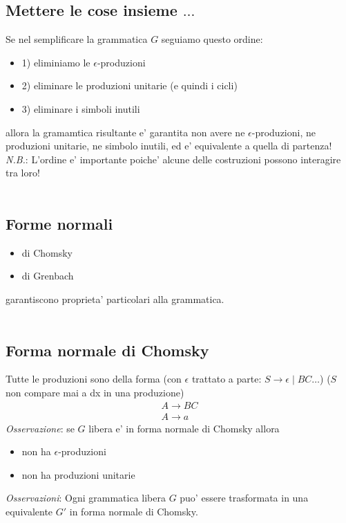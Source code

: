 \documentclass[a4paper,12pt]{article}
\begin{document}
{\subsection*{Mettere le cose insieme $\dots$}
Se nel semplificare la grammatica $G$ seguiamo questo ordine:
\begin{itemize}
  \item 1) eliminiamo le $\epsilon$-produzioni
  \item 2) eliminare le produzioni unitarie (e quindi i cicli)
  \item 3) eliminare i simboli inutili
\end{itemize}
allora la gramamtica risultante e' garantita non avere ne $\epsilon$-produzioni, ne produzioni unitarie, ne simbolo inutili, ed e' equivalente a quella di partenza! \\
\textit{N.B.}: L'ordine e' importante poiche' alcune delle costruzioni possono interagire tra loro!  \\
\vspace{2em} \\
\subsection{Forme normali}
\begin{itemize}
  \item di Chomsky
  \item di Grenbach
\end{itemize}
garantiscono proprieta' particolari alla grammatica. \\
\vspace{10px} \\
\subsection*{Forma normale di Chomsky}
Tutte le produzioni sono della forma (con $\epsilon$ trattato a parte: $S \to \epsilon \mid BC \dots$) ($S$ non compare mai a dx in una produzione)
\begin{align*}
  A \to BC \\
  A \to a
\end{align*}
\textit{Osservazione}: se $G$ libera e' in forma normale di Chomsky allora
\begin{itemize}
  \item non ha $\epsilon$-produzioni
  \item non ha produzioni unitarie
\end{itemize}
\textit{Osservazioni}: Ogni grammatica libera $G$ puo' essere trasformata in una equivalente $G'$ in forma normale di Chomsky. \\
\vspace{10px} \\
}
\end{document}
